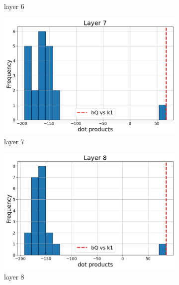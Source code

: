 \documentclass[11pt]{article}
\begin{document}
\begin{figure}[t]
\begin{subfigure}[t]{0.24\textwidth}
    \caption{layer 6}
  \end{subfigure}\hfill
    \vspace{2mm}

    \begin{subfigure}[t]{0.24\textwidth}
    \centering
    \includegraphics[width=1.4\columnwidth]{figures/obs1_appendix/obs1_layer7.png}
    \caption{layer 7}
  \end{subfigure}\hfill
      \begin{subfigure}[t]{0.24\textwidth}
    \centering
    \includegraphics[width=1.4\columnwidth]{figures/obs1_appendix/obs1_layer8.png}
    \caption{layer 8}
  \end{subfigure}\hfill
      \begin{subfigure}[t]{0.24\textwidth}
    \centering

\end{subfigure}
\end{figure}
\end{document}
